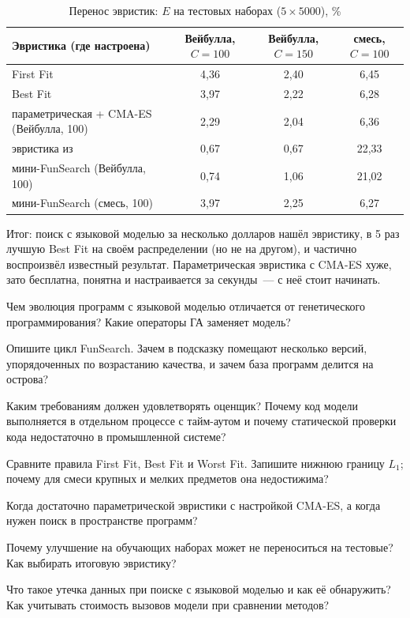 \begin{table}[!htb]
\caption{Перенос эвристик: $E$ на тестовых наборах ($5 \times 5000$), \%}
\label{tab:l9-transfer}
\centering\small
\begin{tabular}{lccc}
\toprule
Эвристика (где настроена) & \makecell{Вейбулла,\\ $C = 100$} & \makecell{Вейбулла,\\ $C = 150$} & \makecell{смесь,\\ $C = 100$} \\
\midrule
First Fit & 4,36 & 2,40 & 6,45 \\
Best Fit & 3,97 & 2,22 & 6,28 \\
параметрическая + CMA-ES (Вейбулла, 100) & 2,29 & 2,04 & 6,36 \\
эвристика из~\cite{romera2024} & 0,67 & 0,67 & 22,33 \\
мини-FunSearch (Вейбулла, 100) & 0,74 & 1,06 & 21,02 \\
мини-FunSearch (смесь, 100) & 3,97 & 2,25 & 6,27 \\
\bottomrule
\end{tabular}
\end{table}

Итог: поиск с языковой моделью за несколько долларов нашёл эвристику, в 5 раз лучшую Best Fit на
своём распределении (но не на другом), и частично воспроизвёл известный результат. Параметрическая
эвристика с CMA-ES хуже, зато бесплатна, понятна и настраивается за секунды~--- с неё стоит начинать.

\begin{questions}
\item Чем эволюция программ с языковой моделью отличается от генетического программирования? Какие
операторы ГА заменяет модель?
\item Опишите цикл FunSearch. Зачем в подсказку помещают несколько версий, упорядоченных по возрастанию
качества, и зачем база программ делится на острова?
\item Каким требованиям должен удовлетворять оценщик? Почему код модели выполняется в отдельном процессе
с тайм-аутом и почему статической проверки кода недостаточно в промышленной системе?
\item Сравните правила First Fit, Best Fit и Worst Fit. Запишите нижнюю границу $L_1$; почему для
смеси крупных и мелких предметов она недостижима?
\item Когда достаточно параметрической эвристики с настройкой CMA-ES, а когда нужен поиск в пространстве
программ?
\item Почему улучшение на обучающих наборах может не переноситься на тестовые? Как выбирать итоговую
эвристику?
\item Что такое утечка данных при поиске с языковой моделью и как её обнаружить? Как учитывать
стоимость вызовов модели при сравнении методов?
\end{questions}
